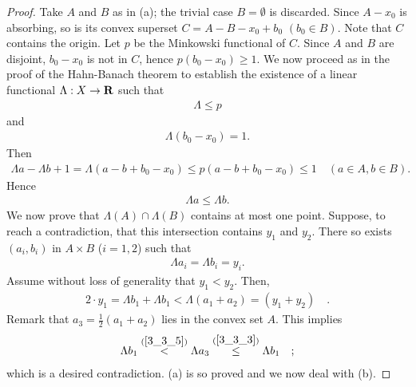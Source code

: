 \begin{proof}%
Take $A$ and $B$ as in (a); the trivial case $B=\emptyset$ is discarded. %
Since $A-x_0$ is absorbing, so is its convex superset %
%
  $C= A-B - x_0 + b_0$ $(b_0 \in B)$. %
%
Note that $C$ contains the origin. %
Let $p$ be the Minkowski functional of $C$. Since $A$ and $B$ are disjoint, %
$b_0-x_0$ is not in $C$, hence $p(b_0-x_0) \geq1$. %
We now proceed as in the proof of the Hahn-Banach theorem  %
to establish the existence of a linear functional %
%
  $\Lambda: X\to  {\mathbf R}$ such that %
%
  \begin{align}
    \Lambda \leq p %
  \end{align}
%
and %
%
  \begin{align}
    \Lambda(b_0-x_0) =1.
  \end{align}%
%
Then %
%
  \begin{align}
    \Lambda a -\Lambda b + 1 =\Lambda (a-b+ b_0-x_0) \leq p (a-b+ b_0-x_0) \leq 1\quad (a\in A, b \in B).
  \end{align}
%
Hence %
%
  \begin{align}\label{3_3_3}
    \Lambda a \leq \Lambda b .
  \end{align}
%
We now prove that $\Lambda (A) \cap \Lambda (B) $ contains at most one point. %
Suppose, to reach a contradiction, that this intersection contains %
%
  $y_1$ and $y_2$. %
%
There so exists %
%
  $(a_i, b_i)$ %
%
in $A\times B$ ($i=1, 2$) such that %
%
  \begin{align}\label{3_3_4}
    \Lambda a_i= \Lambda b_i = y_i .
  \end{align}
%
Assume without loss of generality that $y_1< y_2$. Then, %
%
  \begin{align}\label{3_3_5}
    2\cdot y_1= \Lambda b_1+  \Lambda b_1 < \Lambda ( a_1 + a_2) = (y_1+y_2)  \quad .
  \end{align}
%
Remark that $a_3= \frac{1}{2} (a_1+ a_2)$ lies in the convex set $A$. %
This implies %
%
  \begin{align}
  \Lambda b_1 \overset{(\ref{3_3_5})}{<}  \Lambda a_3 \overset{(\ref{3_3_3})}{\leq} \Lambda b_1\quad ;
  \end{align}
%
which is a desired contradiction. (a) is so proved and we now deal with (b). %
%
\newline\newline\noindent

\end{proof}
